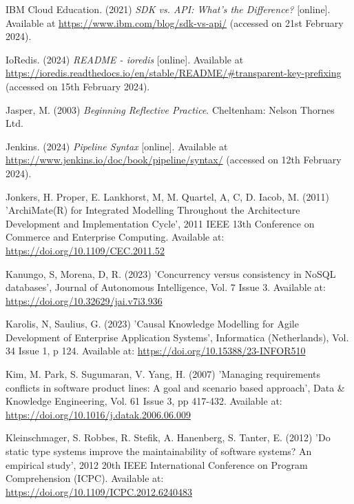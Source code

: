 \noindent IBM Cloud Education. (2021) \textit{SDK vs. API: What's the Difference?} [online]. Available at \url{https://www.ibm.com/blog/sdk-vs-api/} (accessed on 21st February 2024).
\vspace{0.2cm}

\noindent IoRedis. (2024) \textit{README - ioredis} [online]. Available at \url{https://ioredis.readthedocs.io/en/stable/README/#transparent-key-prefixing} (accessed on 15th February 2024).
\vspace{0.2cm}

\noindent Jasper, M. (2003) \textit{Beginning Reflective Practice}. Cheltenham: Nelson Thornes Ltd.
\vspace{0.2cm}

\noindent Jenkins. (2024) \textit{Pipeline Syntax} [online]. Available at \url{https://www.jenkins.io/doc/book/pipeline/syntax/} (accessed on 12th February 2024).
\vspace{0.2cm}

\noindent Jonkers, H. Proper, E. Lankhorst, M, M. Quartel, A, C, D. Iacob, M. (2011) 'ArchiMate(R) for Integrated Modelling Throughout the Architecture Development and Implementation Cycle', 2011 IEEE 13th Conference on Commerce and Enterprise Computing. Available at: \url{https://doi.org/10.1109/CEC.2011.52}
\vspace{0.2cm}

\noindent Kanungo, S, Morena, D, R. (2023) 'Concurrency versus consistency in NoSQL databases', Journal of Autonomous Intelligence, Vol. 7 Issue 3. Available at: \url{https://doi.org/10.32629/jai.v7i3.936}
\vspace{0.2cm}

\noindent Karolis, N, Saulius, G. (2023) 'Causal Knowledge Modelling for Agile Development of Enterprise Application Systems', Informatica (Netherlands), Vol. 34 Issue 1, p 124. Available at: \url{https://doi.org/10.15388/23-INFOR510}
\vspace{0.2cm}

\noindent Kim, M. Park, S. Sugumaran, V. Yang, H. (2007) 'Managing requirements conflicts in software product lines: A goal and scenario based approach', Data \& Knowledge Engineering, Vol. 61 Issue 3, pp 417-432. Available at: \url{https://doi.org/10.1016/j.datak.2006.06.009}
\vspace{0.2cm}

\noindent Kleinschmager, S. Robbes, R. Stefik, A. Hanenberg, S. Tanter, E. (2012) 'Do static type systems improve the maintainability of software systems? An empirical study', 2012 20th IEEE International Conference on Program Comprehension (ICPC). Available at: \url{https://doi.org/10.1109/ICPC.2012.6240483}
\vspace{0.2cm}

